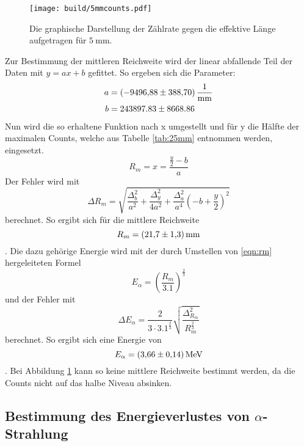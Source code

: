 \begin{figure}
    \centering
    \texttt{[image: build/5mmcounts.pdf]}
  \caption{Die graphische Darstellung der Zählrate gegen die effektive Länge aufgetragen für $\SI{5}{\milli\metre}$.}
  \label{fig:5mmcounts}
\end{figure}
\FloatBarrier
Zur Bestimmung der mittleren Reichweite wird der linear abfallende Teil der Daten mit $y=ax+b$ gefittet.
So ergeben sich die Parameter:
\begin{align*}
  a&=\SI{-9496.88\pm388.70}{\per\milli\metre}\\
  b&=243897.83\pm8668.86
\end{align*}
Nun wird die so erhaltene Funktion nach x umgestellt und für y die Hälfte der maximalen Counts, welche aus Tabelle \ref{tab:25mm}
entnommen werden, eingesetzt.
\begin{equation*}
  R_m = x = \frac{\frac{y}{2}-b}{a}
\end{equation*}
Der Fehler wird mit
\begin{equation*}
  \Delta R_m = \sqrt{\frac{\Delta_{b}^{2}}{a^{2}} + \frac{\Delta_{y}^{2}}{4 a^{2}} + \frac{\Delta_{a}^{2}}{a^{4}} \left(- b + \frac{y}{2}\right)^{2}}
\end{equation*}
berechnet.
So ergibt sich für die mittlere Reichweite
\begin{equation*}
  R_m = \SI{21.7\pm1.3}{\milli\metre}
\end{equation*}.
Die dazu gehörige Energie wird mit der durch Umstellen von \eqref{eqn:rm} hergeleiteten Formel
\begin{equation*}
  E_{\alpha}=(\frac{R_m}{3.1})^{\frac{2}{3}}
\end{equation*}
und der Fehler mit
\begin{equation*}
  \Delta E_{\alpha} = \frac{2}{3 \cdot 3.1^{\frac{2}{3}}} \sqrt{\frac{\Delta_{R_{m}}^{2}}{R_{m}^{\frac{2}{3}}}}
\end{equation*}
berechnet.
So ergibt sich eine Energie von
\begin{equation*}
  E_{\alpha}=\SI{3.66\pm0.14}{\mega\electronvolt}
\end{equation*}.
Bei Abbildung \ref{fig:5mmcounts} kann so keine mittlere Reichweite bestimmt werden, da die Counts nicht auf das halbe Niveau absinken.

\subsection{Bestimmung des Energieverlustes von \texorpdfstring{$\alpha$}{alpha}-Strahlung}



